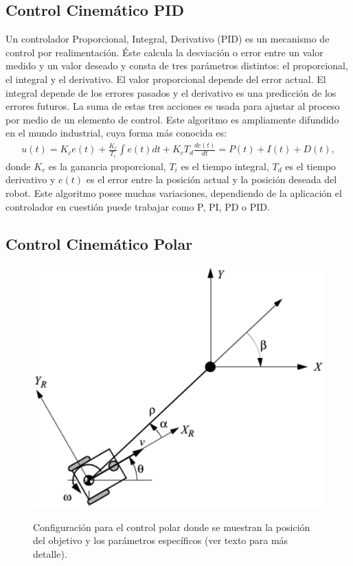 \subsection{Control Cinemático PID}

Un controlador Proporcional, Integral, Derivativo (PID) es un mecanismo de control 
por realimentación. Éste calcula la desviación o error entre un valor medido y 
un valor deseado y consta de tres parámetros distintos: el 
proporcional, el integral y el derivativo. El valor proporcional depende del error 
actual. El integral depende de los errores pasados y el derivativo es una predicción 
de los errores futuros. La suma de estas tres acciones es usada para ajustar al 
proceso por medio de un elemento de control. Este algoritmo es ampliamente 
difundido en el mundo industrial, cuya forma más conocida es:
\begin{align*}
u(t) = K_c e(t) + \frac{K_c}{T_i} \int e(t)dt + K_c T_d \frac{de(t)}{dt} = P(t) + I(t) + D(t),
\end{align*}
donde $K_c$ es la ganancia proporcional, $T_i$ es el tiempo integral, $T_d$ es 
el tiempo derivativo y $e(t)$ es el error entre la posición actual y la posición 
deseada del robot. Este algoritmo posee muchas variaciones, dependiendo de la 
aplicación el controlador en cuestión puede trabajar como P, PI, PD o PID.

\subsection{Control Cinem\'atico Polar}
\label{sec:ControlPolar}
\begin{figure}%
\centering \footnotesize
 {\includegraphics[width=0.70\linewidth]{images/control_polar.eps}}
 \captionsetup{font=footnotesize}
 \caption[Configuración para el control polar donde se muestran la posición del 
 objetivo y los parámetros específicos(ver texto para
 más detalle).]{Configuración para el control polar donde se muestran la posición del 
 objetivo y los parámetros específicos \cite{siegwart2011introduction} (ver texto para
 más detalle).}
\label{f:controlPolar}
\end{figure}

